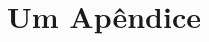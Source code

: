 \documentclass[11pt,a4paper]{report}
\begin{document}

\renewcommand{\bibname}{Referências bibliográficas}



\appendix
\chapter{Um Apêndice}
\end{document}
